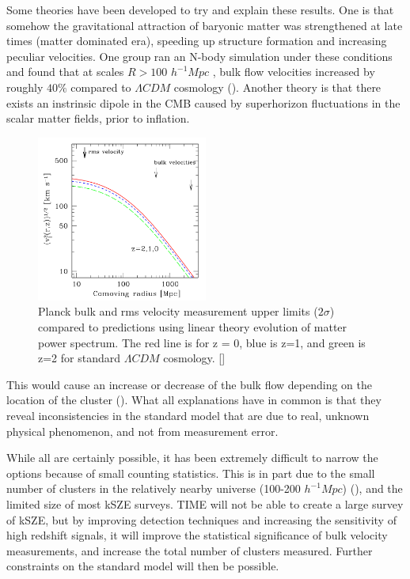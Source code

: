 \documentclass[manuscript]{aastex}
\begin{document}
Some theories have been developed to try and explain these results. One is that somehow the gravitational attraction of baryonic matter was strengthened at late times (matter dominated era), speeding up structure formation and increasing peculiar velocities. One group ran an N-body simulation under these conditions and found that at scales  \(R > 100\) \(h^{-1} Mpc\) , bulk flow velocities increased by roughly \(40\%\) compared to \(\Lambda CDM\) cosmology (\cite{Wyman2010}). Another theory is that there exists an instrinsic dipole in the CMB caused by superhorizon fluctuations in the scalar matter fields, prior to inflation.
\begin{figure}
  \vspace{-0.8cm}
    \begin{center}
      \includegraphics[width=0.5\textwidth]{kitayama1.png}
    \end{center}
\caption[ Planck constraints on bulk flow -[\cite{Kitayama2014}]{Planck bulk and rms velocity measurement upper limits (\(2\sigma\)) compared to predictions using linear theory evolution of matter power spectrum. The red line is for z = 0, blue is z=1, and green is z=2 for standard \(\Lambda CDM\) cosmology.  [\cite{Kitayama2014}]}
\label{fig:bulkflow}
\vspace{-0.8cm}
\end{figure}
This would cause an increase or decrease of the bulk flow depending on the location of the cluster (\cite{Mak2011}).  What all explanations have in common is that they reveal inconsistencies in the standard model that are due to real, unknown physical phenomenon, and not from measurement error. 

While all are certainly possible, it has been extremely difficult to narrow the options because of small counting statistics. This is in part due to the small number of clusters in the relatively nearby universe (100-200 \(h^{-1} Mpc\)) (\cite{Lavaux2013}), and the limited size of most kSZE surveys. TIME will not be able to create a large survey of kSZE, but by improving detection techniques and increasing the sensitivity of high redshift signals, it will improve the statistical significance of bulk velocity measurements, and increase the total number of clusters measured. Further constraints on the standard model will then be possible.  
\end{document}
